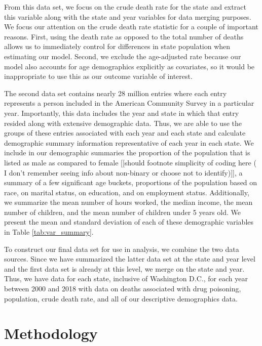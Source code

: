 \documentclass{article}
\begin{document}
From this data set, we focus on the crude death rate for the state and extract this variable along with the state and year variables for data merging purposes. We focus our attention on the crude death rate statistic for a couple of important reasons. First, using the death rate as opposed to the total number of deaths allows us to immediately control for differences in state population when estimating our model. Second, we exclude the age-adjusted rate because our model also accounts for age demographics explicitly as covariates, so it would be inappropriate to use this as our outcome variable of interest.

The second data set contains nearly 28 million entries where each entry represents a person included in the American Community Survey in a particular year.  Importantly, this data includes the year and state in which that entry resided along with extensive demographic data. Thus, we are able to use the groups of these entries associated with each year and each state and calculate demographic summary information representative of each year in each state. We include in our demographic summaries the proportion of the population that is listed as male as compared to female [[should footnote simplicity of coding here ( I don't remember seeing info about non-binary or choose not to identify)]], a summary of a few significant age buckets, proportions of the population based on race, on marital status, on education, and on employment status. Additionally, we summarize the mean number of hours worked, the median income, the mean number of children, and the mean number of children under 5 years old. We present the mean and standard deviation of each of these demographic variables in Table \ref{tab:var_summary}.

To construct our final data set for use in analysis, we combine the two data sources. Since we have summarized the latter data set at the state and year level and the first data set is already at this level, we merge on the state and year. Thus, we have data for each state, inclusive of Washington D.C., for each year between 2000 and 2018 with data on deaths associated with drug poisoning, population, crude death rate, and all of our descriptive demographics data.



\section{Methodology}
\end{document}
